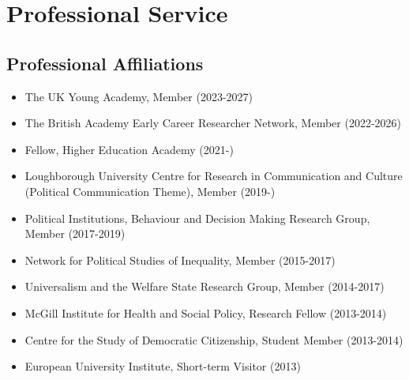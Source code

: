\documentclass[letterpaper,fontsize=10.5pt]{scrartcl}
\begin{document}
\section{Professional Service}
\subsection{Professional Affiliations}
\begin{itemize}[itemsep=0em, topsep=0em, partopsep=0em]
	\item The UK Young Academy, Member (2023-2027)
	\item The British Academy Early Career Researcher Network, Member (2022-2026)
	\item Fellow, Higher Education Academy (2021-)
	\item Loughborough University Centre for Research in Communication and Culture (Political Communication Theme), Member (2019-)
	\item Political Institutions, Behaviour and Decision Making Research Group, Member (2017-2019)
	\item Network for Political Studies of Inequality, Member (2015-2017)
	\item Universalism and the Welfare State Research Group, Member (2014-2017)
	\item McGill Institute for Health and Social Policy, Research Fellow (2013-2014)
	\item Centre for the Study of Democratic Citizenship, Student Member (2013-2014)
	\item European University Institute, Short-term Visitor (2013)
\end{itemize}
\end{document}
